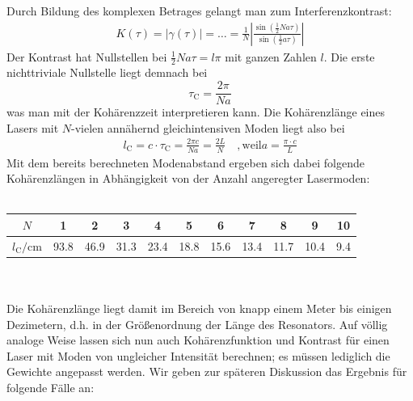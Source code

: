 \documentclass[german,  %
parskip=full,  %
]{scrartcl}
\begin{document}
Durch Bildung des komplexen Betrages gelangt man zum Interferenzkontrast:
\begin{align*}
K(\tau) = |\gamma(\tau)| = \hdots = \frac{1}{N} \left|\frac{\sin\left(\frac{1}{2}Na\tau\right) }{\sin\left(\frac{1}{2}a\tau\right) }\right|
\end{align*}
Der Kontrast hat Nullstellen bei \(\frac{1}{2}Na\tau = l\pi\) mit ganzen Zahlen \(l\). Die erste nichttriviale Nullstelle liegt demnach bei
\[\tau_{\mathrm{C}} = \frac{2\pi}{Na}\]
was man mit der Kohärenzzeit interpretieren kann. Die Kohärenzlänge eines Lasers mit \(N\)-vielen annähernd gleichintensiven Moden liegt also bei
\begin{align}
l_{\mathrm{C}} = c\cdot\tau_{\mathrm{C}} = \frac{2\pi c}{Na} = \frac{2L}{N} \quad , \text{weil} a = \frac{\pi\cdot c}{L} 
\end{align}
Mit dem bereits berechneten Modenabstand ergeben sich dabei folgende Kohärenzlängen in Abhängigkeit von der Anzahl angeregter Lasermoden: \\\\
\begin{table}[h!] \centering
\begin{tabular}{|c|c|c|c|c|c|c|c|c|c|c|}
\hline
\(N\) & 1 & 2 & 3 & 4 & 5 & 6 & 7 & 8 & 9 & 10\\\hline
\(l_{\mathrm{C}} \mathrm{/} \mathrm{cm}\) & 93.8 & 46.9 & 31.3 & 23.4 & 18.8 & 15.6 & 13.4 & 11.7 & 10.4 & 9.4 \\\hline
\end{tabular}
\end{table} \\\\
Die Kohärenzlänge liegt damit im Bereich von knapp einem Meter bis einigen Dezimetern, d.h. in der Größenordnung der Länge des Resonators. Auf völlig analoge Weise lassen sich nun auch Kohärenzfunktion und Kontrast für einen Laser mit Moden von ungleicher Intensität berechnen; es müssen lediglich die Gewichte angepasst werden. Wir geben zur späteren Diskussion das Ergebnis für folgende Fälle an:
\end{document}
